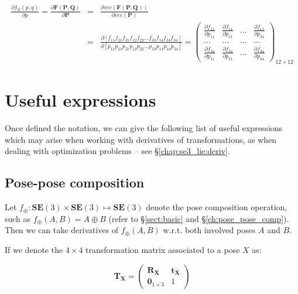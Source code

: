 \documentclass[a4paper,11pt]{report}
\begin{document}
\begin{eqnarray}
\label{eq:deriv_sample3}
\frac{\partial f_\oplus(p,q)}{\partial p} = 
\frac{\partial \mathbf{F} (\mathbf{P},\mathbf{Q})}{\partial \mathbf{P}}
&=&
\frac{\partial vec( \mathbf{F} (\mathbf{P},\mathbf{Q})) }{\partial vec(\mathbf{P}) }
\\
&=&
\frac{\partial [
f_{11} f_{21} f_{31} 
f_{12} f_{22} ...  
f_{33} f_{14} f_{24} f_{34}] }
{\partial [
p_{11} p_{21} p_{31} 
p_{12} p_{22} ... 
p_{33} p_{14} p_{24} p_{34}] } 
=
\left(
\begin{array}{cccc}
 \frac{\partial f_{11}}{\partial  p_{11} } &  \frac{\partial f_{11}}{\partial  p_{21} } & ...  & \frac{\partial f_{11}}{\partial  p_{34} } \\
  ... & ... & ... & ... \\ 
 \frac{\partial f_{34}}{\partial  p_{11} } &  \frac{\partial f_{34}}{\partial  p_{21} } & ...  & \frac{\partial f_{34}}{\partial  p_{34} }
\end{array}
\right)_{12 \times 12}
\end{eqnarray}



\section{Useful expressions}
\label{sect:mat_deriv:exp}

Once defined the notation, we can give the following list of 
useful expressions which may arise when working with derivatives of transformations,
as when dealing with optimization problems -- see \S\ref{chap:se3_lie:deriv}.


\subsection{Pose-pose composition}

Let $f_\oplus: \mathbf{SE}(3) \times \mathbf{SE}(3) \mapsto \mathbf{SE}(3)$ denote 
the pose composition operation, 
such as $f_\oplus(A,B) = A \oplus B$ 
(refer to \S\ref{sect:basic} and \S\ref{ch:pose_pose_comp}).
Then we can take derivatives of $f_\oplus(A,B)$ w.r.t. both involved poses $A$ and $B$. 

If we denote the $4 \times 4$ transformation matrix associated to a pose $X$ as:

\begin{equation}
 \mathbf{T_X} = 
\left(
\begin{array}{c|c}
  \mathbf{R_X} & \mathbf{t_X} \\
\hline
  \mathbf{0}_{1\times 3} & 1
\end{array}
\right) 
\end{equation}
\end{document}
